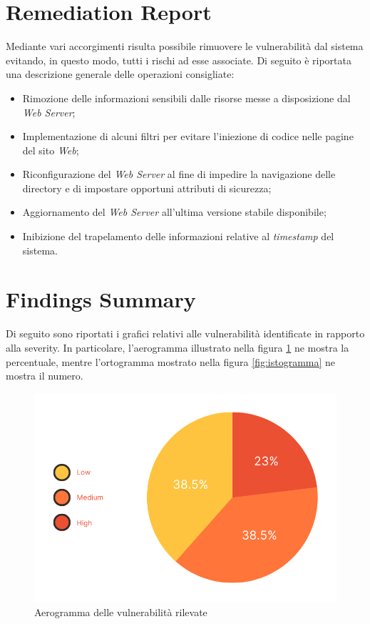 \documentclass[a4paper,11pt,oneside,top=3cm,bottom=3cm,left=3.5cm,right=3.5cm,openright,reqno,table]{book}
\begin{document}
\section{Remediation Report}
Mediante vari accorgimenti risulta possibile rimuovere le vulnerabilità dal sistema evitando, in questo modo, tutti i rischi ad esse associate. Di seguito è riportata una descrizione generale delle operazioni consigliate:
\begin{itemize}
    \item Rimozione delle informazioni sensibili dalle risorse messe a disposizione dal \emph{Web Server};
    \item Implementazione di alcuni filtri per evitare l'iniezione di codice nelle pagine del sito \emph{Web};
    \item Riconfigurazione del \emph{Web Server} al fine di impedire la navigazione delle directory e di impostare opportuni attributi di sicurezza;
    \item Aggiornamento del \emph{Web Server} all'ultima versione stabile disponibile;
    \item Inibizione del trapelamento delle informazioni relative al \emph{timestamp} del sistema.
\end{itemize}
\section{Findings Summary}
Di seguito sono riportati i grafici relativi alle vulnerabilità identificate in rapporto alla severity. In particolare, l'aerogramma illustrato nella figura \ref{fig:aerogramma} ne mostra la percentuale, mentre l'ortogramma mostrato nella figura \ref{fig:istogramma} ne mostra il numero.
\begin{figure}[h]
    \centering
    \includegraphics[scale=0.4]{capitoli/images/aerogramma.png}
    \caption{Aerogramma delle vulnerabilità rilevate}
    \label{fig:aerogramma}
\end{figure}
\end{document}

